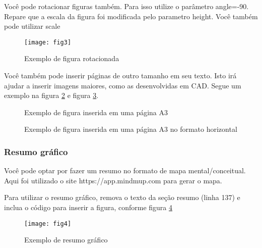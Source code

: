 \documentclass[	DIV=calc,%
							paper=a4,%
							fontsize=12pt,%
							onecolumn]{scrartcl}	 					%
\begin{document}
Você pode rotacionar figuras também. Para isso utilize o parâmetro angle=-90. Repare que a escala da figura foi modificada pelo parametro height. Você também pode utilizar scale

\begin{figure}
	\centering
	\texttt{[image: fig3]}
	\caption{Exemplo de figura rotacionada}
	\label{fig3}
\end{figure}

Você também pode inserir páginas de outro tamanho em seu texto. Isto irá ajudar a inserir imagens maiores, como as desenvolvidas em CAD. Segue um exemplo na figura \ref{fig4} e figura \ref{fig5}.


\clearpage
{}
\recalctypearea

\begin{figure}
	\centering
	\caption{Exemplo de figura inserida em uma página A3}
	\label{fig4}
\end{figure}

\clearpage
{}
\recalctypearea


\clearpage
{}
\recalctypearea

	
\begin{figure}
	\noindent{}
	\caption{Exemplo de figura inserida em uma página A3 no formato horizontal}
	\label{fig5}
\end{figure}

\clearpage
{}
\recalctypearea


\subsubsection{Resumo gráfico}

Você pode optar por fazer um resumo no formato de mapa mental/conceitual. 
Aqui foi utilizado o site https://app.mindmup.com para gerar o mapa.

Para utilizar o resumo gráfico, remova o texto da seção resumo (linha 137) e inclua o código para inserir a figura, conforme figura \ref{fig6}

\begin{figure}[h]
	\centering
	\texttt{[image: fig4]}
	\caption{Exemplo de resumo gráfico}
	\label{fig6}	
\end{figure}

\end{document}
